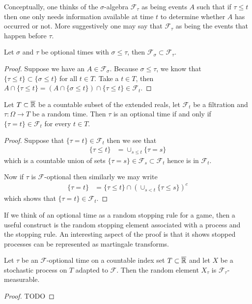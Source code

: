 Conceptually, one thinks of the $\sigma$-algebra $\mathcal{F}_\tau$ as being
events $A$ such that if $\tau \leq t$ then one only needs information
available at time $t$ to determine whether $A$ has occurred or not.
More suggestively one may say that $\mathcal{F}_\tau$ as being the
events that happen before $\tau$.

\begin{lem}Let $\sigma$ and $\tau$ be optional times with $\sigma \leq
  \tau$, then $\mathcal{F}_\sigma \subset \mathcal{F}_\tau$.
 \end{lem}
\begin{proof}Suppose we have an $A \in \mathcal{F}_\sigma$.  Because
  $\sigma \leq \tau$, we know that$\lbrace \tau \leq t
  \rbrace \subset \lbrace \sigma \leq t \rbrace$  for all $t \in T$.  Take a 
  $t \in T$, then $A \cap \lbrace \tau \leq t \rbrace = (A \cap
  \lbrace \sigma \leq t \rbrace) \cap \lbrace \tau \leq t \rbrace \in \mathcal{F}_t$.
\end{proof}

\begin{lem}Let $T \subset \overline{\mathbb{R}}$ be a countable subset of
  the extended reals, let $\mathcal{F}_t$ be a filtration and $\tau :
  \Omega \to T$ be a random time.  Then $\tau$ is an optional time if
  and only if $\lbrace \tau = t \rbrace \in \mathcal{F}_t$ for every
  $t \in T$.
\end{lem}
\begin{proof}
Suppose that $\lbrace \tau = t \rbrace \in \mathcal{F}_t$ then we see
that 
\begin{align*}
\lbrace \tau \leq t \rbrace &= \cup_{s \leq t} \lbrace \tau = s \rbrace
\end{align*}
which is a countable union of sets $\lbrace \tau = s \rbrace \in
\mathcal{F}_s \subset \mathcal{F}_t$ hence is in $\mathcal{F}_t$.

Now if $\tau$ is $\mathcal{F}$-optional then similarly we may write
\begin{align*}
\lbrace \tau = t \rbrace &= \lbrace \tau \leq t \rbrace \cap \left(
  \cup_{s < t} \lbrace \tau \leq s \rbrace\right )^c
\end{align*}
which shows that $\lbrace \tau = t \rbrace \in \mathcal{F}_t$.
\end{proof}

If we think of an optional time as a random stopping rule for a game, then a
useful construct is the random stopping element associated with a
process and the stopping rule.  An interesting aspect of the proof is
that it shows stopped processes can be represented as martingale transforms.
\begin{lem}Let $\tau$ be an $\mathcal{F}$-optional time on a countable index set $T
  \subset \overline{\mathbb{R}}$ and let $X$ be a stochastic
  process on $T$ adapted to $\mathcal{F}$. Then the random element $X_\tau$ is $\mathcal{F}_\tau$-measurable.
\end{lem}
\begin{proof}
TODO
\end{proof}


